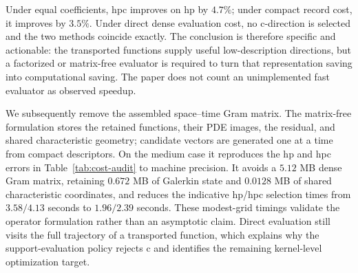 \documentclass[11pt]{article}
\numberwithin{algorithm}{section}
\theoremstyle{definition}\newtheorem{definition}[theorem]{Definition}
\theoremstyle{remark}\newtheorem{remark}[theorem]{Remark}
\begin{document}
\begin{table}[h]
\centering
\caption{Cost audit for the medium blinking-vortex case.  A compact record
stores the parameters defining a function and shares the prescribed flow map;
the direct-support budget instead counts every sampled basis value evaluated by
the present dense numerical implementation.}
\label{tab:cost-audit}
\end{table}

Under equal coefficients, hpc improves on hp by $4.7\%$; under compact record
cost, it improves by $3.5\%$.  Under direct dense evaluation cost, no
c-direction is selected and the two methods coincide exactly.  The conclusion
is therefore specific and actionable: the transported functions supply useful
low-description directions, but a factorized or matrix-free evaluator is
required to turn that representation saving into computational saving.  The
paper does not count an unimplemented fast evaluator as observed speedup.

We subsequently remove the assembled space--time Gram matrix.  The
matrix-free formulation stores the retained functions, their PDE images,
the residual, and shared characteristic geometry; candidate vectors are
generated one at a time from compact descriptors.  On the medium case it
reproduces the hp and hpc errors in Table~\ref{tab:cost-audit} to machine
precision.  It avoids a $5.12$ MB dense Gram matrix, retaining $0.672$ MB of
Galerkin state and $0.0128$ MB of shared characteristic coordinates, and
reduces the indicative hp/hpc selection times from $3.58/4.13$ seconds to
$1.96/2.39$ seconds.  These modest-grid timings validate the operator
formulation rather than an asymptotic claim.  Direct evaluation still visits
the full trajectory of a transported function, which explains why the
support-evaluation policy rejects c and identifies the remaining kernel-level
optimization target.
\end{document}
